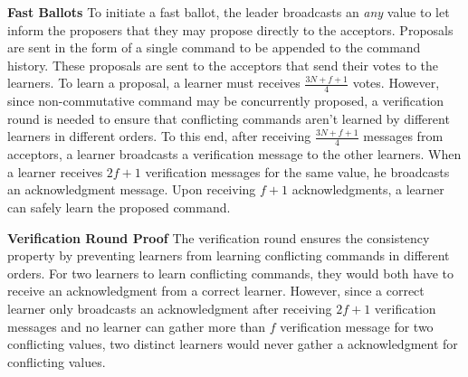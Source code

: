 \textbf{Fast Ballots} To initiate a fast ballot, the leader broadcasts an \textit{any} value to let inform the proposers that they may propose directly to the acceptors. Proposals are sent in the form of a single command to be appended to the command history. These proposals are sent to the acceptors that send their votes to the learners. To learn a proposal, a learner must receives $\frac{3N+f+1}{4}$ votes. However, since non-commutative command may be concurrently proposed, a verification round is needed to ensure that conflicting commands aren't learned by different learners in different orders. To this end, after receiving $\frac{3N+f+1}{4}$ messages from acceptors, a learner broadcasts a verification message to the other learners. When a learner receives $2f+1$ verification messages for the same value, he broadcasts an acknowledgment message. Upon receiving $f+1$ acknowledgments, a learner can safely learn the proposed command. \par
\textbf{Verification Round Proof} The verification round ensures the consistency property by preventing learners from learning conflicting commands in different orders. For two learners to learn conflicting commands, they would both have to receive an acknowledgment from a correct learner. However, since a correct learner only broadcasts an acknowledgment after receiving $2f+1$ verification messages and no learner can gather more than $f$ verification message for two conflicting values, two distinct learners would never gather a acknowledgment for conflicting values.
